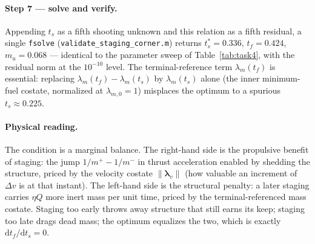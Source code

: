 \documentclass[../main.tex]{subfiles}
\begin{document}
\paragraph{Step 7 --- solve and verify.}
Appending $t_s$ as a fifth shooting unknown and this relation as a fifth residual, a single \texttt{fsolve} (\texttt{validate\_staging\_corner.m}) returns $t_s^\ast = 0.336$, $t_f = 0.424$, $m_u = 0.068$ --- identical to the parameter sweep of Table~\ref{tab:task4}, with the residual norm at the $10^{-10}$ level. The terminal-reference term $\lambda_m(t_f)$ is essential: replacing $\lambda_m(t_f) - \lambda_m(t_s)$ by $\lambda_m(t_s)$ alone (the inner minimum-fuel costate, normalized at $\lambda_{m,0}=1$) misplaces the optimum to a spurious $t_s \approx 0.225$.

\paragraph{Physical reading.}
The condition is a marginal balance. The right-hand side is the propulsive benefit of staging: the jump $1/m^+ - 1/m^-$ in thrust acceleration enabled by shedding the structure, priced by the velocity costate $\|\boldsymbol{\lambda}_v\|$ (how valuable an increment of $\Delta v$ is at that instant). The left-hand side is the structural penalty: a later staging carries $\eta Q$ more inert mass per unit time, priced by the terminal-referenced mass costate. Staging too early throws away structure that still earns its keep; staging too late drags dead mass; the optimum equalizes the two, which is exactly $\mathrm{d}t_f/\mathrm{d}t_s = 0$.
\end{document}
